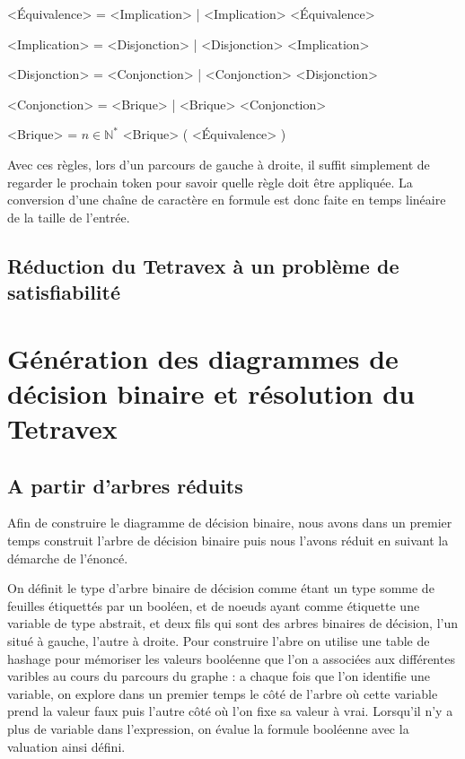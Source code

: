 \documentclass[11pt]{article}
\begin{document}
\setlength{\grammarparsep}{0.3em}
\begin{grammar}

<Équivalence> = <Implication> | <Implication> \Leftrightarrow{} <Équivalence>

<Implication> = <Disjonction> | <Disjonction> \Rightarrow{} <Implication>

<Disjonction> = <Conjonction> | <Conjonction> \lor{} <Disjonction>

<Conjonction> = <Brique> | <Brique> \land{} <Conjonction>

<Brique> = $n \in{} \mathbb{N}^{*}$
\alt \top
\alt \bot
\alt \neg <Brique>
\alt ( <Équivalence> )

\end{grammar}

Avec ces règles, lors d'un parcours de gauche à droite, il suffit simplement de regarder le prochain token pour savoir quelle règle doit être appliquée.
La conversion d'une chaîne de caractère en formule est donc faite en temps linéaire de la taille de l'entrée.

\subsection{Réduction du Tetravex à un problème de satisfiabilité}

\section{Génération des diagrammes de décision binaire et résolution du Tetravex}
\subsection{A partir d'arbres réduits}
Afin de construire le diagramme de décision binaire, nous avons dans un premier temps construit l'arbre de décision binaire puis nous l'avons réduit en suivant la démarche de l'énoncé.

On définit le type d'arbre binaire de décision comme étant un type somme de feuilles étiquettés par un booléen, et de noeuds ayant comme étiquette une variable de type abstrait, et deux fils qui sont des arbres binaires de décision, l'un situé à gauche, l'autre à droite. Pour construire l'abre on utilise une table de hashage pour mémoriser les valeurs booléenne que l'on a associées aux différentes varibles au cours du parcours du graphe : a chaque fois que l'on identifie une variable, on explore dans un premier temps le côté de l'arbre où cette variable prend la valeur faux puis l'autre côté où l'on fixe sa valeur à vrai. Lorsqu'il n'y a plus de variable dans l'expression, on évalue la formule booléenne avec la valuation ainsi défini.
\end{document}
